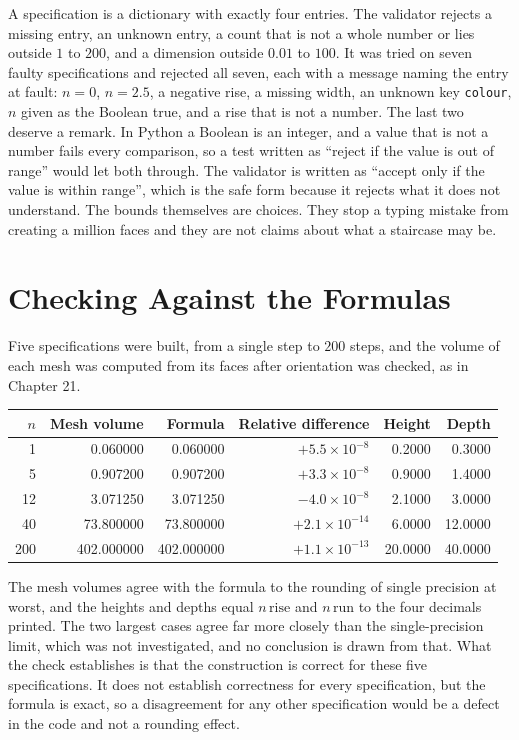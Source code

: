 A specification is a dictionary with exactly four entries. The validator rejects a missing entry, an unknown entry, a count that is not a whole number or lies outside $1$ to $200$, and a dimension outside $0.01$ to $100$. It was tried on seven faulty specifications and rejected all seven, each with a message naming the entry at fault: $n=0$, $n=2.5$, a negative rise, a missing width, an unknown key \texttt{colour}, $n$ given as the Boolean true, and a rise that is not a number. The last two deserve a remark. In Python a Boolean is an integer, and a value that is not a number fails every comparison, so a test written as ``reject if the value is out of range'' would let both through. The validator is written as ``accept only if the value is within range'', which is the safe form because it rejects what it does not understand. The bounds themselves are choices. They stop a typing mistake from creating a million faces and they are not claims about what a staircase may be.

\section{Checking Against the Formulas}

Five specifications were built, from a single step to $200$ steps, and the volume of each mesh was computed from its faces after orientation was checked, as in Chapter 21.

\begin{center}
\begin{tabular}{rrrrrr}
\toprule
$n$ & Mesh volume & Formula & Relative difference & Height & Depth\\
\midrule
1 & 0.060000 & 0.060000 & $+5.5\times10^{-8}$ & 0.2000 & 0.3000\\
5 & 0.907200 & 0.907200 & $+3.3\times10^{-8}$ & 0.9000 & 1.4000\\
12 & 3.071250 & 3.071250 & $-4.0\times10^{-8}$ & 2.1000 & 3.0000\\
40 & 73.800000 & 73.800000 & $+2.1\times10^{-14}$ & 6.0000 & 12.0000\\
200 & 402.000000 & 402.000000 & $+1.1\times10^{-13}$ & 20.0000 & 40.0000\\
\bottomrule
\end{tabular}
\end{center}

The mesh volumes agree with the formula to the rounding of single precision at worst, and the heights and depths equal $n\,\mathrm{rise}$ and $n\,\mathrm{run}$ to the four decimals printed. The two largest cases agree far more closely than the single-precision limit, which was not investigated, and no conclusion is drawn from that. What the check establishes is that the construction is correct for these five specifications. It does not establish correctness for every specification, but the formula is exact, so a disagreement for any other specification would be a defect in the code and not a rounding effect.

